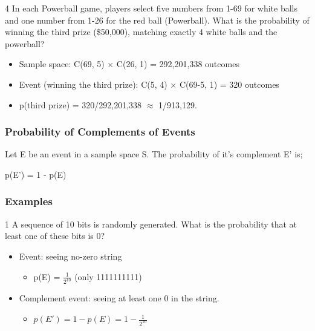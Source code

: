 \documentclass[12pt, letterpaper]{article}
\newcommand{\exheader}[1][ex]{{\tiny{#1}\normalsize}}
\begin{document}
\bigbreak
\bigbreak

\exheader[4] In each Powerball game, players select five numbers from 1-69 for white balls and one number from 1-26 for the red ball (Powerball). What is the probability of winning the third prize (\$50,000), matching exactly 4 white balls and the powerball?
\begin{itemize}[leftmargin=*,  label={}]
	\item Sample space: C(69, 5) × C(26, 1) = 292,201,338 outcomes
	\item Event (winning the third prize): C(5, 4) × C(69-5, 1) = 320 outcomes
	\item p(third prize) = 320/292,201,338 $\approx$ 1/913,129.
\end{itemize}


\pagebreak

\subsubsection*{Probability of Complements of Events}
Let E be an event in a sample space S. The probability of it's complement E' is; 
\begin{center}
	p(E') = 1 - p(E)
\end{center}

\bigbreak
\bigbreak

\subsubsection*{Examples}

\exheader[1] A sequence of 10 bits is randomly generated. What is the probability that at least one of these bits is 0?
\begin{itemize}[leftmargin=*,  label={}]
	\item Event: seeing no-zero string
	\begin{itemize}
		\item p(E) = $\frac{1}{2^{10}}$ {\tiny (only 1111111111)}
	\end{itemize}
	\item Complement event: seeing at least one  0 in the string.
	\begin{itemize}
		\item $p(E') = 1 - p(E) = 1 - \frac{1}{2^{10}}$
	\end{itemize}
\end{itemize}

\bigbreak
\bigbreak
\end{document}
